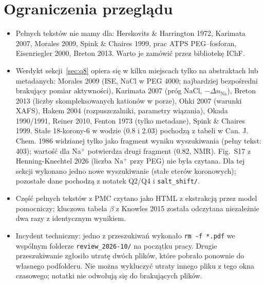 \documentclass[10pt,a4paper]{article}
\begin{document}
\section{Ograniczenia przeglądu}\label{sec:ogr}
\begin{itemize}
\item Pełnych tekstów nie mamy dla: Herskovits \& Harrington 1972, Karimata 2007, Morales 2009, Spink \& Chaires 1999, prac ATPS PEG--fosforan, Eisenriegler 2000, Breton 2013. Warto je zamówić przez bibliotekę IChF.
\item Werdykt sekcji~\ref{sec:q8} opiera się w kilku miejscach tylko na abstraktach lub metadanych: Morales 2009 (ISE, NaCl w PEG 4000; najbardziej bezpośredni brakujący pomiar aktywności), Karimata 2007 (próg NaCl, $-\Delta n_\text{Na}$), Breton 2013 (liczby skompleksowanych kationów w porze), Ohki 2007 (warunki XAFS), Hakem 2004 (rozpuszczalniki, parametry wiązania), Okada 1990/1991, Reiner 2010, Fenton 1973 (tylko metadane), Spink \& Chaires 1999. Stałe 18-korony-6 w wodzie (0.8 i 2.03) pochodzą z tabeli w Can. J. Chem. 1986 widzianej tylko jako fragment wyniku wyszukiwania (pełny tekst: 403); wartość dla Na$^+$ potwierdza drugi fragment (0.82, NMR). Fig.~S17 z Henning-Knechtel 2026 (liczba Na$^+$ przy PEG) nie była czytana. Dla tej sekcji wykonano jedno nowe wyszukiwanie (stałe eterów koronowych); pozostałe dane pochodzą z notatek Q2/Q4 i \texttt{salt\_shift/}.
\item Część pełnych tekstów z PMC czytano jako HTML z ekstrakcją przez model pomocniczy; kluczowa tabela $\beta$ z Knowles 2015 została odczytana niezależnie dwa razy z identycznym wynikiem.
\item Incydent techniczny: jedno z przeszukiwań wykonało \texttt{rm -f *.pdf} we wspólnym folderze \texttt{review\_2026-10/} na początku pracy. Drugie przeszukiwanie zgłosiło utratę dwóch plików, które pobrało ponownie do własnego podfolderu. Nie można wykluczyć utraty innego pliku z tego okna czasowego; notatki nie odwołują się do brakujących plików.
\end{itemize}
\end{document}
